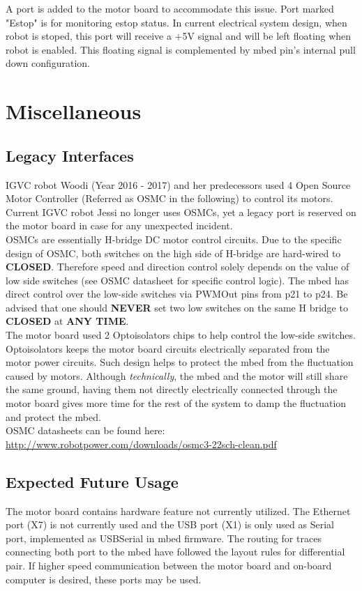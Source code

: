 \documentclass[letterpaper, 12pt]{article}
\begin{document}
A port is added to the motor board to accommodate this issue. Port marked "Estop" is for monitoring estop status. In current electrical system design, when robot is stoped, this port will receive a +5V signal and will be left floating when robot is enabled. This floating signal is complemented by mbed pin's internal pull down configuration. 

\section{Miscellaneous}
\subsection{Legacy Interfaces}
IGVC robot Woodi (Year 2016 - 2017) and her predecessors used 4 Open Source Motor Controller (Referred as OSMC in the following) to control its motors. Current IGVC robot Jessi no longer uses OSMCs, yet a legacy port is reserved on the motor board in case for any unexpected incident. \vspace{6pt}\\
OSMCs are essentially H-bridge DC motor control circuits. Due to the specific design of OSMC, both switches on the high side of H-bridge are hard-wired to \textbf{CLOSED}. Therefore speed and direction control solely depends on the value of low side switches (see OSMC datasheet for specific control logic). The mbed has direct control over the low-side switches via PWMOut pins from p21 to p24. Be advised that one should \textbf{NEVER} set two low switches on the same H bridge to \textbf{CLOSED} at \textbf{ANY TIME}. \vspace{6pt}\\
The motor board used 2 Optoisolators chips to help control the low-side switches. Optoisolators keeps the motor board circuits electrically separated from the motor power circuits. Such design helps to protect the mbed from the fluctuation caused by motors. Although \emph{technically}, the mbed and the motor will still share the same ground, having them not directly electrically connected through the motor board gives more time for the rest of the system to damp the fluctuation and protect the mbed. \vspace{6pt}\\
OSMC datasheets can be found here: \url{http://www.robotpower.com/downloads/osmc3-22sch-clean.pdf}\\

\subsection{Expected Future Usage}
The motor board contains hardware feature not currently utilized. The Ethernet port (X7) is not currently used and the USB port (X1) is only used as Serial port, implemented as USBSerial in mbed firmware. The routing for traces connecting both port to the mbed have followed the layout rules for differential pair. If higher speed communication between the motor board and on-board computer is desired, these ports may be used.
\end{document}
